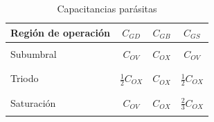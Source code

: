 \documentclass[10pt]{article}
\begin{document}
\begin{table}[h]
	\centering
	\begin{tabular}{|l|c|c|c|}
		\hline
		Región de operación & $C_{GD}$            & $C_{GB}$ & $C_{GS}$            \\
		\hline
		                    &                     &          &                     \\
		Subumbral           & $C_{OV}$            & $C_{OX}$ & $C_{OV}$            \\
		                    &                     &          &                     \\
		\hline
		                    &                     &          &                     \\
		Triodo              & $\frac{1}{2}C_{OX}$ & $C_{OX}$ & $\frac{1}{2}C_{OX}$ \\
		                    &                     &          &                     \\
		\hline
		                    &                     &          &                     \\
		Saturación          & $C_{OV}$            & $C_{OX}$ & $\frac{2}{3}C_{OX}$ \\
		                    &                     &          &                     \\
		\hline
	\end{tabular}
	\caption{Capacitancias parásitas}
\end{table}
\end{document}
